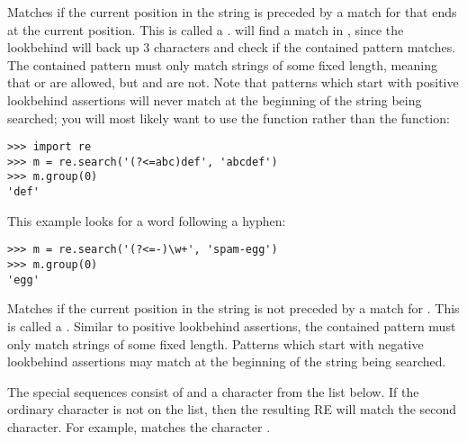 \begin{list}{}{\leftmargin 0.7in }
\item[\code{(?<=...)}] Matches if the current position in the string
is preceded by a match for  that ends at the current
position.  This is called a .
 will find a match in , since the
lookbehind will back up 3 characters and check if the contained
pattern matches.  The contained pattern must only match strings of
some fixed length, meaning that  or  are
allowed, but  and  are not.  Note that
patterns which start with positive lookbehind assertions will never
match at the beginning of the string being searched; you will most
likely want to use the  function rather than the
 function:

\begin{verbatim}
>>> import re
>>> m = re.search('(?<=abc)def', 'abcdef')
>>> m.group(0)
'def'
\end{verbatim}

This example looks for a word following a hyphen:

\begin{verbatim}
>>> m = re.search('(?<=-)\w+', 'spam-egg')
>>> m.group(0)
'egg'
\end{verbatim}

\item[\code{(?<!...)}] Matches if the current position in the string
is not preceded by a match for .  This is called a
.  Similar to positive lookbehind
assertions, the contained pattern must only match strings of some
fixed length.  Patterns which start with negative lookbehind
assertions may match at the beginning of the string being searched.

\end{list}

The special sequences consist of \character{\e} and a character from the
list below.  If the ordinary character is not on the list, then the
resulting RE will match the second character.  For example,
\regexp{\e\$} matches the character \character{\$}.

